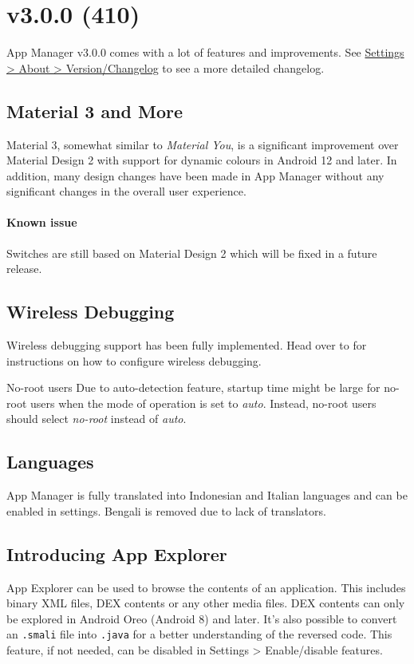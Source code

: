 \section{v3.0.0 (410)}\label{sec:v3.0.0-(410)}

App Manager v3.0.0 comes with a lot of features and improvements.
See \href{app-manager://settings/about/version}{Settings > About > Version/Changelog} to see a more detailed changelog.

\subsection{Material 3 and More}
Material 3, somewhat similar to \textit{Material You}, is a significant improvement over Material Design 2 with support for dynamic colours in Android 12 and later.
In addition, many design changes have been made in App Manager without any significant changes in the overall user experience.

\paragraph{Known issue} Switches are still based on Material Design 2 which will be fixed in a future release.

\subsection{Wireless Debugging}
Wireless debugging support has been fully implemented. Head over to  for instructions on how to configure wireless debugging.

\begin{tip}{No-root users}
    Due to auto-detection feature, startup time might be large for no-root users when the mode of operation is set to \textit{auto}.
    Instead, no-root users should select \textit{no-root} instead of \textit{auto}.
\end{tip}

\subsection{Languages}
App Manager is fully translated into Indonesian and Italian languages and can be enabled in settings. Bengali is removed due to lack of translators.

\subsection{Introducing App Explorer}
App Explorer can be used to browse the contents of an application. This includes binary XML files, DEX contents or any other media files.
DEX contents can only be explored in Android Oreo (Android 8) and later. It's also possible to convert an \texttt{.smali} file into \texttt{.java} for a better understanding of the reversed code.
This feature, if not needed, can be disabled in Settings > Enable/disable features.

